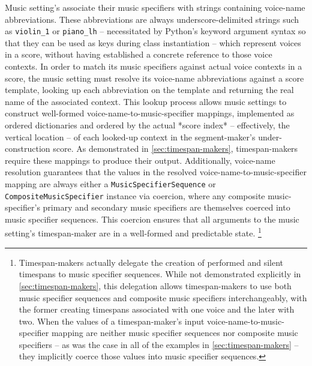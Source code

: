 Music setting's associate their music specifiers with strings containing
voice-name abbreviations. These abbreviations are always underscore-delimited
strings such as \texttt{violin\_1} or \texttt{piano\_lh} -- necessitated by
Python's keyword argument syntax so that they can be used as keys during class
instantiation -- which represent voices in a score, without having established
a concrete reference to those voice contexts. In order to match its music
specifiers against actual voice contexts in a score, the music setting must
resolve its voice-name abbreviations against a score template, looking up each
abbreviation on the template and returning the real name of the associated
context. This lookup process allows music settings to construct well-formed
voice-name-to-music-specifier mappings, implemented as ordered dictionaries and
ordered by the actual *score index* -- effectively, the vertical location -- of
each looked-up context in the segment-maker's under-construction score. As
demonstrated in \autoref{sec:timespan-makers}, timespan-makers require these
mappings to produce their output. Additionally, voice-name resolution
guarantees that the values in the resolved voice-name-to-music-specifier
mapping are always either a \texttt{MusicSpecifierSequence} or
\texttt{CompositeMusicSpecifier} instance via coercion, where any composite
music-specifier's primary and secondary music specifiers are themselves coerced
into music specifier sequences. This coercion ensures that all arguments to the
music setting's timespan-maker are in a well-formed and predictable state.
\footnote{Timespan-makers actually delegate the creation of performed and
silent timespans to music specifier sequences. While not demonstrated
explicitly in \autoref{sec:timespan-makers}, this delegation allows
timespan-makers to use both music specifier sequences and composite music
specifiers interchangeably, with the former creating timespans associated with
one voice and the later with two. When the values of a timespan-maker's input
voice-name-to-music-specifier mapping are neither music specifier sequences nor
composite music specifiers -- as was the case in all of the examples in
\autoref{sec:timespan-makers} -- they implicitly coerce those values into music
specifier sequences.}

\begin{comment}
<abjad>
music_setting = consort.MusicSetting(
    timespan_identifier=consort.RatioPartsExpression(
        parts=(0, 2),
        ratio=(1, 3, 2),
        ),
    timespan_maker=consort.FloodedTimespanMaker(),
    violin_2_lh='A',
    viola_lh=('B', 'C', 'D'),
    cello=consort.CompositeMusicSpecifier(
        primary_music_specifier='one',
        secondary_music_specifier=consort.MusicSpecifierSequence(
            music_specifiers=['two', 'three', 'four'],
            ),
        )
    )
</abjad>
\end{comment}

